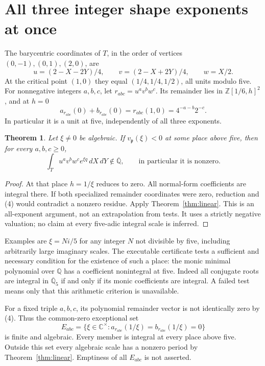 \documentclass[11pt]{article}
\newtheorem{theorem}{Theorem}
\newcommand{\Q}{\mathbb Q}
\newcommand{\Qb}{\overline{\mathbb Q}}
\newcommand{\C}{\mathbb C}
\begin{document}
\section{All three integer shape exponents at once}
The barycentric coordinates of $T$, in the order of vertices
$(0,-1),(0,1),(2,0)$, are
\[
 u=(2-X-2Y)/4,\qquad v=(2-X+2Y)/4,\qquad w=X/2.
\]
At the critical point $(1,0)$ they equal $(1/4,1/4,1/2)$, all units
modulo five. For nonnegative integers $a,b,c$, let $r_{abc}=u^av^bw^c$.
Its remainder lies in $\mathbb Z[1/6,h]^2$, and at $h=0$
\[
 a_{r_{abc}}(0)+b_{r_{abc}}(0)=r_{abc}(1,0)=4^{-a-b}2^{-c}. \tag{4}
\]
In particular it is a unit at five, independently of all three exponents.

\begin{theorem}\label{thm:all-shapes}
Let $\xi\ne0$ be algebraic. If $v_{\mathfrak p}(\xi)<0$ at some place
above five, then for every $a,b,c\ge0$,
\[
 \int_T u^av^bw^c e^{\xi q}\,dX\,dY\notin\Qb,
 \qquad\text{in particular it is nonzero.}
\]
\end{theorem}
\begin{proof}
At that place $h=1/\xi$ reduces to zero. All normal-form coefficients are
integral there. If both specialized remainder coordinates were zero,
reduction and (4) would contradict a nonzero residue. Apply
Theorem~\ref{thm:linear}. This is an all-exponent argument, not an
extrapolation from tests. It uses a strictly negative valuation; no claim
at every five-adic integral scale is inferred.
\end{proof}

Examples are $\xi=Ni/5$ for any integer $N$ not divisible by five, including
arbitrarily large imaginary scales. The executable certificate tests a
sufficient and necessary condition for the existence of such a place:
the monic minimal polynomial over $\Q$ has a coefficient nonintegral at
five. Indeed all conjugate roots are integral in $\overline{\Q}_5$ if and
only if its monic coefficients are integral. A failed test means only
that this arithmetic criterion is unavailable.

For a fixed triple $a,b,c$, its polynomial remainder vector is not
identically zero by (4). Thus the common-zero exceptional set
\[
 E_{abc}=\{\xi\in\C^\times:
          a_{r_{abc}}(1/\xi)=b_{r_{abc}}(1/\xi)=0\}
\]
is finite and algebraic. Every member is integral at every place above
five. Outside this set every algebraic scale has a nonzero period by
Theorem~\ref{thm:linear}. Emptiness of all $E_{abc}$ is not asserted.
\end{document}
